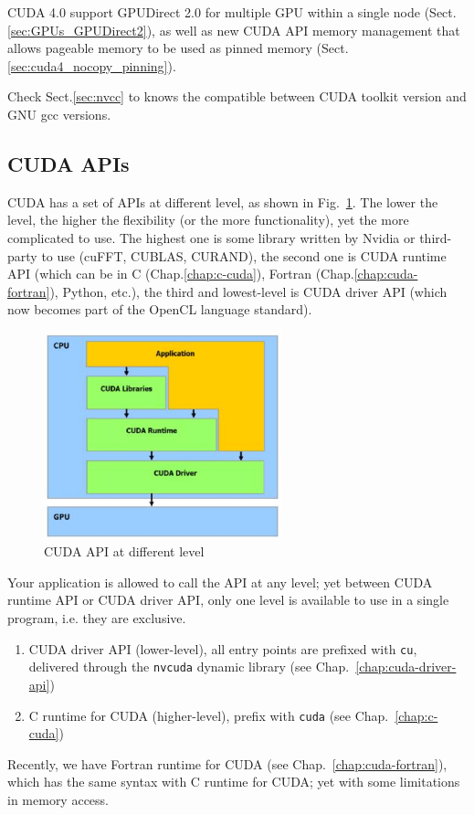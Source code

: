 CUDA 4.0 support GPUDirect 2.0 for multiple GPU within a single node
(Sect.\ref{sec:GPUs_GPUDirect2}), as well as new CUDA API memory management that
allows pageable memory to be used as pinned memory
(Sect.\ref{sec:cuda4_nocopy_pinning}).


Check Sect.\ref{sec:nvcc} to knows the compatible between CUDA toolkit version
and GNU gcc versions.

\subsection{CUDA APIs}
\label{sec:cuda-apis}

CUDA has a set of APIs at different level, as shown in
Fig.~\ref{fig:CUDA_API}. The lower the level, the higher the
flexibility (or the more functionality), yet the more complicated to
use. The highest one is some library written by Nvidia or third-party to use
(cuFFT, CUBLAS, CURAND), the second one is CUDA runtime API (which can be in C
(Chap.\ref{chap:c-cuda}), Fortran (Chap.\ref{chap:cuda-fortran}), Python, etc.),
the third and lowest-level is CUDA driver API (which now becomes part of the
OpenCL language standard).

\begin{figure}[hbt]
  \centerline{\includegraphics[height=6cm,
    angle=0]{./images/CUDA_API.eps}}
  \caption{CUDA API at different level}
  \label{fig:CUDA_API}
\end{figure}

Your application is allowed to call the API at any level; yet between CUDA
runtime API or CUDA driver API, only one level is available to use in a single
program, i.e. they are exclusive. 

\begin{enumerate}
\item CUDA driver API (lower-level), all entry points are prefixed
  with \verb!cu!, delivered through the \verb!nvcuda! dynamic library
  (see Chap.~\ref{chap:cuda-driver-api})
\item C runtime for CUDA (higher-level), prefix with \verb!cuda! (see
  Chap.~\ref{chap:c-cuda})
\end{enumerate}
Recently, we have Fortran runtime for CUDA (see
Chap.~\ref{chap:cuda-fortran}), which has the same syntax with C
runtime for CUDA; yet with some limitations in memory access.

